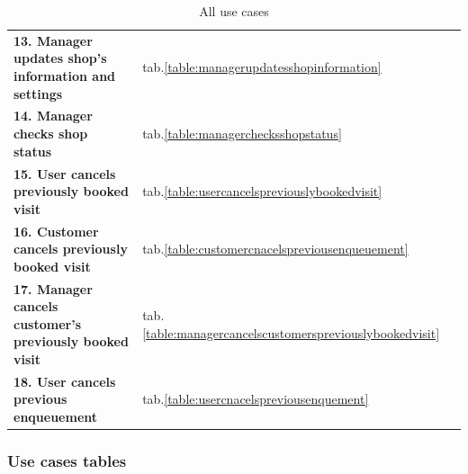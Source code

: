 \begin{table}[h!]
\begin{tabular}{@{}P{0.57\textwidth}P{0.20\textwidth}P{0.20\textwidth}@{}}
        \textbf{13. Manager updates shop's information and settings} & tab.\ref{table:managerupdatesshopinformation} & \\
        \textbf{14. Manager checks shop status} & tab.\ref{table:managerchecksshopstatus} & \\
        \textbf{15. User cancels previously booked visit} & tab.\ref{table:usercancelspreviouslybookedvisit} & \\
        \textbf{16. Customer cancels previously booked visit} & tab.\ref{table:customercnacelspreviousenqueuement} & \\
        \textbf{17. Manager cancels customer's previously booked visit} & tab.\ref{table:managercancelscustomerspreviouslybookedvisit} & \\
        \textbf{18. User cancels previous enqueuement} & tab.\ref{table:usercnacelspreviousenquement} & \\
        \bottomrule
    \end{tabular}
\caption{All use cases}
\label{table:usecase1}
\end{table}

\subsubsection{Use cases tables}

